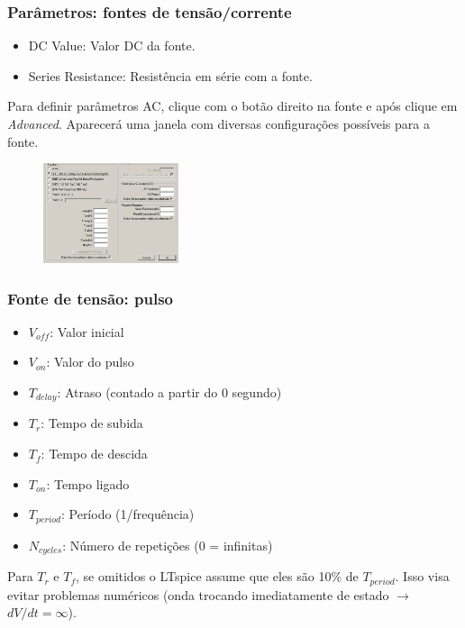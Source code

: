 \documentclass{beamer}
\begin{document}
\begin{frame} %
\frametitle{Parâmetros: fontes de tensão/corrente}
\begin{itemize}
\item {DC Value}: Valor DC da fonte.
\item {Series Resistance}: Resistência em série com a fonte.
\end{itemize}
Para definir parâmetros AC, clique com o botão direito na fonte e após clique em \textit{Advanced}. Aparecerá uma janela com diversas configurações possíveis para a fonte.
\begin{figure}[htb]
\includegraphics[width=150px]{images/paramfonte.png}
\end{figure}
\end{frame}

\begin{frame} %
\frametitle{Fonte de tensão: pulso}
\begin{itemize}
\item {$V_{off}$}: Valor inicial
\item {$V_{on}$}: Valor do pulso
\item {$T_{delay}$}: Atraso (contado a partir do 0 segundo)
\item {$T_{r}$}: Tempo de subida 
\item {$T_{f}$}: Tempo de descida
\item {$T_{on}$}: Tempo ligado
\item {$T_{period}$}: Período (1/frequência)
\item {$N_{cycles}$}: Número de repetições (0 = infinitas)
\end{itemize}
Para $T_r$ e $T_f$, se omitidos o LTspice assume que eles são 10\% de $T_{period}$.
Isso visa evitar problemas numéricos (onda trocando imediatamente de estado $\rightarrow$ $dV/dt = \infty$).
\end{frame}
\end{document}

